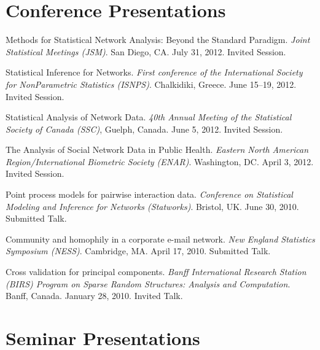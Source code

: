 \documentclass[10pt,letterpaper]{article}
\renewenvironment{itemize}{
  \begin{list}{}{
    \setlength{\leftmargin}{1.5em}
    \setlength{\itemsep}{0.25em}
    \setlength{\parskip}{0pt}
    \setlength{\parsep}{0.25em}
  }
}{
  \end{list}
}
\begin{document}
\section*{Conference Presentations}
\begin{itemize}
\item Methods for Statistical Network Analysis: Beyond the Standard Paradigm.
  \textit{Joint Statistical Meetings (JSM)}.
  San Diego, CA.
  July 31, 2012.
  Invited Session.

\item Statistical Inference for Networks. 
  \textit{First conference of the International Society for NonParametric Statistics (ISNPS)}.
  Chalkidiki, Greece.
  June 15--19, 2012.
  Invited Session.

\item Statistical Analysis of Network Data.
  \textit{40th Annual Meeting of the Statistical Society of Canada (SSC)},
  Guelph, Canada.
  June 5, 2012.
  Invited Session.

\item The Analysis of Social Network Data in Public Health.
  \textit{Eastern North American Region/International Biometric Society (ENAR)}.
  Washington, DC.
  April 3, 2012.
  Invited Session.

\item Point process models for pairwise interaction data.
  \textit{Conference on Statistical Modeling and Inference for Networks (Statworks)}.
  Bristol, UK.
  June 30, 2010.
  Submitted Talk.

\item Community and homophily in a corporate e-mail network.
  \textit{New England Statistics Symposium (NESS)}.
  Cambridge, MA.
  April 17, 2010.
  Submitted Talk.

\item Cross validation for principal components.
  \textit{Banff International Research Station (BIRS) Program on Sparse Random Structures: Analysis and Computation}.
  Banff, Canada.
  January 28, 2010.
  Invited Talk.
\end{itemize}


\section*{Seminar Presentations}
\end{document}
